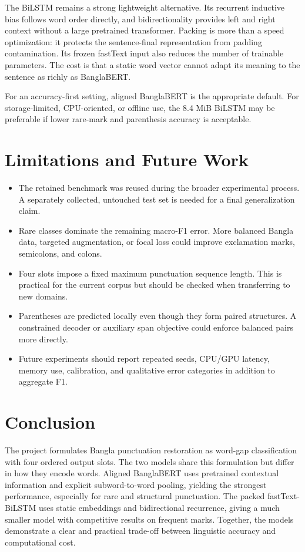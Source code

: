 \documentclass[11pt,a4paper]{article}
\begin{document}
The BiLSTM remains a strong lightweight alternative. Its recurrent inductive bias follows word order directly, and bidirectionality provides left and right context without a large pretrained transformer. Packing is more than a speed optimization: it protects the sentence-final representation from padding contamination. Its frozen fastText input also reduces the number of trainable parameters. The cost is that a static word vector cannot adapt its meaning to the sentence as richly as BanglaBERT.

For an accuracy-first setting, aligned BanglaBERT is the appropriate default. For storage-limited, CPU-oriented, or offline use, the 8.4 MiB BiLSTM may be preferable if lower rare-mark and parenthesis accuracy is acceptable.

\section{Limitations and Future Work}
\begin{itemize}
  \item The retained benchmark was reused during the broader experimental process. A separately collected, untouched test set is needed for a final generalization claim.
  \item Rare classes dominate the remaining macro-F1 error. More balanced Bangla data, targeted augmentation, or focal loss could improve exclamation marks, semicolons, and colons.
  \item Four slots impose a fixed maximum punctuation sequence length. This is practical for the current corpus but should be checked when transferring to new domains.
  \item Parentheses are predicted locally even though they form paired structures. A constrained decoder or auxiliary span objective could enforce balanced pairs more directly.
  \item Future experiments should report repeated seeds, CPU/GPU latency, memory use, calibration, and qualitative error categories in addition to aggregate F1.
\end{itemize}

\section{Conclusion}
The project formulates Bangla punctuation restoration as word-gap classification with four ordered output slots. The two models share this formulation but differ in how they encode words. Aligned BanglaBERT uses pretrained contextual information and explicit subword-to-word pooling, yielding the strongest performance, especially for rare and structural punctuation. The packed fastText-BiLSTM uses static embeddings and bidirectional recurrence, giving a much smaller model with competitive results on frequent marks. Together, the models demonstrate a clear and practical trade-off between linguistic accuracy and computational cost.
\end{document}
